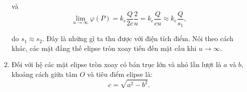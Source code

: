\begin{loigiai}
\begin{enumerate}[1)]
và 
    \[\lim_{u \to \infty} \varphi (P) = k_e \frac{Q}{2c} \frac{2}{u}= k_e \frac{Q}{cu} \approx k_e \frac{Q}{s_1} , \tag{8} \]

do $s_1 \approx s_2$. Đây là những gì ta thu được với điện tích điểm. Nói theo cách khác, các mặt đẳng thế elipse tròn xoay tiến đến mặt cầu khi $u\rightarrow \infty$.
  \item Đối với hệ các mặt elipse tròn xoay có bán trục lớn và nhỏ lần lượt là $a$ và $b$, khoảng cách giữa tâm $O$ và tiêu điểm elipse là:
   \[c=\sqrt{a^2 - b^2} . \tag{9}\]

\begin{center}



\begin{tikzpicture}[x=0.75pt,y=0.75pt,yscale=-1,xscale=1]


\end{tikzpicture}
\end{center}
\end{enumerate}
\end{loigiai}
